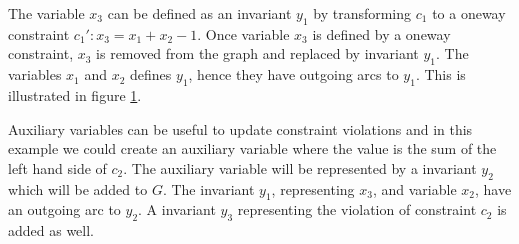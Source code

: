 The variable $x_3$ can be defined as an invariant $y_1$ by transforming $c_1$ to a oneway constraint $c_1': x_3 = 
x_1+x_2-1$. Once variable $x_3$ is defined by a oneway constraint, $x_3$ is removed from the graph and replaced by 
invariant $y_1$. The variables $x_1$ and $x_2$ defines $y_1$, hence they have outgoing arcs to $y_1$. This is 
illustrated in figure \ref{fig_smallG}. \\ 
\begin{figure}[t]
\begin{center}
    \label{fig_smallG}
\end{center}
\end{figure} \noindent
Auxiliary variables can be useful to update constraint violations and in this example we could create an auxiliary 
variable where the value is the sum of the left hand side of $c_2$. The auxiliary variable will be represented 
by a  invariant $y_2$ which will be added to $G$. The invariant $y_1$, representing $x_3$, and variable 
$x_2$, have an outgoing arc to $y_2$. A  invariant $y_3$ representing the violation of constraint 
$c_2$ is added as well.
\begin{figure}[b]
\begin{center}
    \label{fig_smallG2}
\end{center}
\end{figure}
